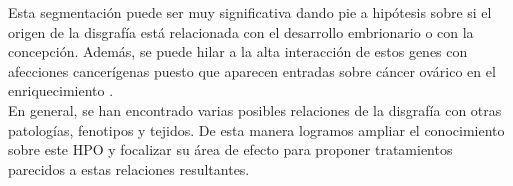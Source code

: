 Esta segmentación puede ser muy significativa dando pie a hipótesis sobre si el origen de la disgrafía está relacionada con el desarrollo embrionario o con la concepción. Además, se puede hilar a la alta interacción de estos genes con afecciones cancerígenas puesto que aparecen entradas sobre cáncer ovárico en el enriquecimiento \cite{Mad2014}.\\

En general, se han encontrado varias posibles relaciones de la disgrafía con otras patologías, fenotipos y tejidos. De esta manera logramos ampliar el conocimiento sobre este HPO y focalizar su área de efecto para proponer tratamientos parecidos a estas relaciones resultantes.

